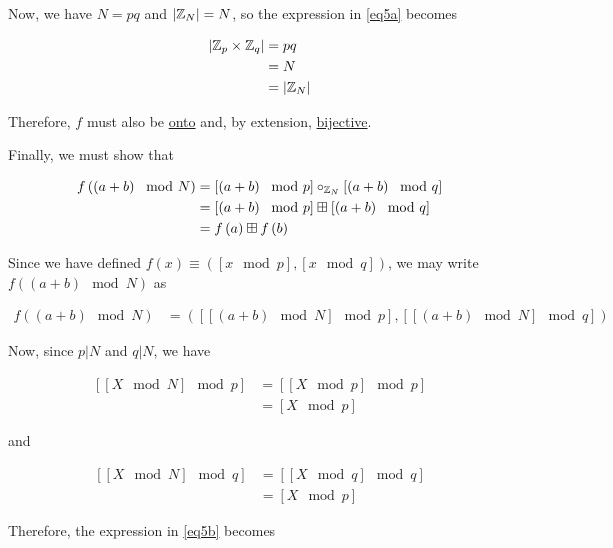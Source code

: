 \documentclass[../CryptoFinal.tex]{subfiles}
\begin{document}
\begin{flushleft}
Now, we have $N = p q$ and $\left| \mathbb{Z}_N \right| = N$, so the expression in \ref{eq5a} becomes

\begin{align*}
  \left| \mathbb{Z}_p \times \mathbb{Z}_q \right| &= p q \\
  &= N \\
  &= \left| \mathbb{Z}_N \right|
\end{align*}

Therefore, $f$ must also be \underline{onto} and, by extension, \underline{bijective}. \newline

Finally, we must show that 

\begin{align*}
  f \left( \left(a + b\right) \mod N \right) &= \left[\left( a + b \right) \mod p \right] \circ_{\mathbb{Z}_N} \left[\left( a + b \right) \mod q \right] \\
  &= \left[\left( a + b \right) \mod p \right] \boxplus \left[\left( a + b \right) \mod q \right] \\
  &= f \left( a \right) \boxplus f \left( b \right)
\end{align*}

Since we have defined $f \left( x \right) \equiv \left( \left[ x \mod p \right], \left[ x \mod q \right] \right)$, we may write $f \left( \left(a + b\right) \mod N \right)$ as 

\begin{align}
  f \left( \left(a + b\right) \mod N \right) &= \left( \left[ \left[ \left(a + b\right) \mod N \right] \mod p \right], \left[ \left[ \left(a + b\right) \mod  N \right] \mod q \right] \right) \label{eq5b}
\end{align}

Now, since $p \vert N$ and $q \vert N$, we have

\begin{align*}
  \left[ \left[ X \mod N \right] \mod p \right] &= \left[ \left[ X \mod p \right] \mod p \right] \\
  &= \left[ X \mod p \right] 
\end{align*}

and

\begin{align*}
  \left[ \left[ X \mod N \right] \mod q \right] &= \left[ \left[ X \mod q \right] \mod q \right] \\
  &= \left[ X \mod p \right] 
\end{align*}

Therefore, the expression in \ref{eq5b} becomes


\end{flushleft}
\end{document}
